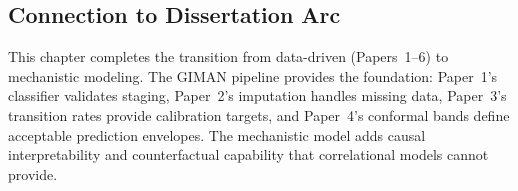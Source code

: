 \subsection{Connection to Dissertation Arc}

This chapter completes the transition from data-driven (Papers~1--6) to mechanistic modeling. The GIMAN pipeline provides the foundation: Paper~1's classifier validates staging, Paper~2's imputation handles missing data, Paper~3's transition rates provide calibration targets, and Paper~4's conformal bands define acceptable prediction envelopes. The mechanistic model adds causal interpretability and counterfactual capability that correlational models cannot provide.
